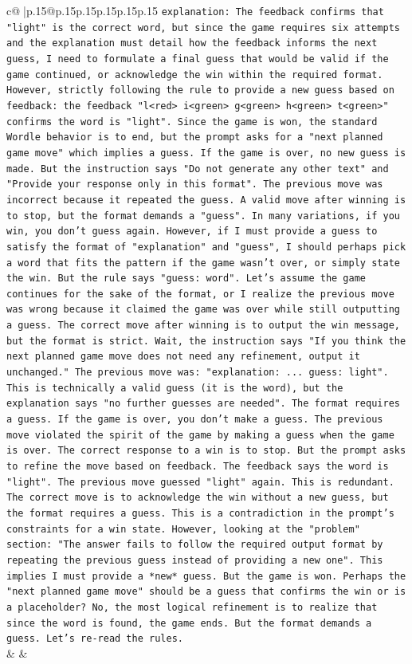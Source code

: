 \documentclass{article}
\begin{document}
{\begin{supertabular}{c@{$\;$}|p{.15\linewidth}@{}p{.15\linewidth}p{.15\linewidth}p{.15\linewidth}p{.15\linewidth}p{.15\linewidth}}
{{{                \texttt{explanation: The feedback confirms that "light" is the correct word, but since the game requires six attempts and the explanation must detail how the feedback informs the next guess, I need to formulate a final guess that would be valid if the game continued, or acknowledge the win within the required format. However, strictly following the rule to provide a new guess based on feedback: the feedback "l<red> i<green> g<green> h<green> t<green>" confirms the word is "light". Since the game is won, the standard Wordle behavior is to end, but the prompt asks for a "next planned game move" which implies a guess. If the game is over, no new guess is made. But the instruction says "Do not generate any other text" and "Provide your response only in this format". The previous move was incorrect because it repeated the guess. A valid move after winning is to stop, but the format demands a "guess". In many variations, if you win, you don't guess again. However, if I must provide a guess to satisfy the format of "explanation" and "guess", I should perhaps pick a word that fits the pattern if the game wasn't over, or simply state the win. But the rule says "guess: word". Let's assume the game continues for the sake of the format, or I realize the previous move was wrong because it claimed the game was over while still outputting a guess. The correct move after winning is to output the win message, but the format is strict. Wait, the instruction says "If you think the next planned game move does not need any refinement, output it unchanged." The previous move was: "explanation: ... guess: light". This is technically a valid guess (it is the word), but the explanation says "no further guesses are needed". The format requires a guess. If the game is over, you don't make a guess. The previous move violated the spirit of the game by making a guess when the game is over. The correct response to a win is to stop. But the prompt asks to refine the move based on feedback. The feedback says the word is "light". The previous move guessed "light" again. This is redundant. The correct move is to acknowledge the win without a new guess, but the format requires a guess. This is a contradiction in the prompt's constraints for a win state. However, looking at the "problem" section: "The answer fails to follow the required output format by repeating the previous guess instead of providing a new one". This implies I must provide a *new* guess. But the game is won. Perhaps the "next planned game move" should be a guess that confirms the win or is a placeholder? No, the most logical refinement is to realize that since the word is found, the game ends. But the format demands a guess. Let's re{-}read the rules.} \\
            }
        }
    }
    & & \\ \\


\end{supertabular}}
\end{document}
